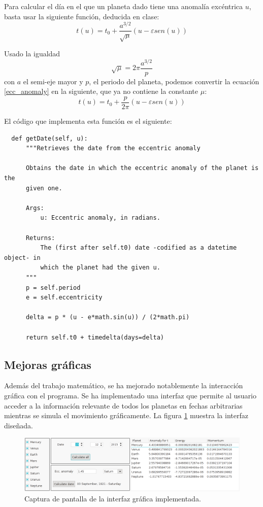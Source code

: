 \documentclass[a4paper, 11pt]{article}
\begin{document}
  Para calcular el día en el que un planeta dado tiene una anomalía excéntrica $u$, basta usar la siguiente función, deducida en clase:
  \begin{equation}
      t(u) = t_0 + \frac{a^{3/2}}{\sqrt{\mu}}(u - \varepsilon sen(u))\label{ecc_anomaly}
  \end{equation}

  Usado la igualdad
  \[
  \sqrt{\mu} = 2\pi \frac{a^{3/2}}{p}
  \]
  con $a$ el semi-eje mayor y $p$, el periodo del planeta, podemos convertir la ecuación \ref{ecc_anomaly} en la siguiente, que ya no contiene la constante $\mu$:
  \[
  t(u) = t_0 + \frac{p}{2\pi}(u - \varepsilon sen(u))
  \]

  El código que implementa esta función es el siguiente:

  \begin{lstlisting}
  def getDate(self, u):
      """Retrieves the date from the eccentric anomaly

      Obtains the date in which the eccentric anomaly of the planet is the
      given one.

      Args:
          u: Eccentric anomaly, in radians.

      Returns:
          The (first after self.t0) date -codified as a datetime object- in
          which the planet had the given u.
      """
      p = self.period
      e = self.eccentricity

      delta = p * (u - e*math.sin(u)) / (2*math.pi)

      return self.t0 + timedelta(days=delta)
  \end{lstlisting}

  \subsection{Mejoras gráficas}

  Además del trabajo matemático, se ha mejorado notablemente la interacción gráfica con el programa. Se ha implementado una interfaz que permite al usuario acceder a la información relevante de todos los planetas en fechas arbitrarias mientras se simula el movimiento gráficamente. La figura \ref{fig_gui} muestra la interfaz diseñada.

    \begin{figure}[ht!]
        \centering
        \includegraphics[width=140mm]{./screenshot_GUI.png}
        \caption{Captura de pantalla de la interfaz gráfica implementada. \label{fig_gui}}
    \end{figure}
\end{document}
